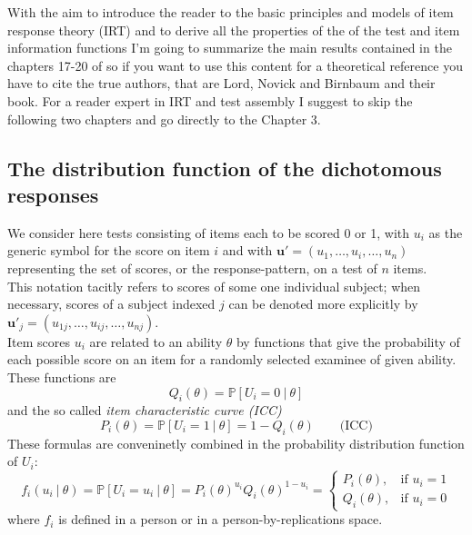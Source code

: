 With the aim to introduce the reader to the basic principles and models of item response theory (IRT) and to derive all the properties of the of the test and item information functions I'm going to summarize the main results contained in the chapters 17-20 of \cite{Lord1968} so if you want to use this content for a theoretical reference you have to cite the true authors, that are Lord, Novick and Birnbaum and their book. For a reader expert in IRT and test assembly I suggest to skip the following two chapters and go directly to the Chapter 3. 
\subsection{The distribution function of the dichotomous responses}
We consider here tests consisting of items each to be scored 0 or 1, with $u_i$ as the generic symbol for the score on item $i$ and with $\boldsymbol{u}' = (u_1,\ldots,u_i,\ldots,u_n)$ representing the set of scores, or the response-pattern, on a test of $n$ items.\\
This notation tacitly refers to scores of some one individual subject; when necessary, scores of a subject indexed $j$ can be denoted more explicitly by $\boldsymbol{u}'_j = (u_{1j},\ldots,u_{ij},\ldots,u_{nj})$.\\
Item scores $u_i$ are related to an ability $\theta$ by functions that give the probability of each possible score on an item for a randomly selected examinee of given ability. These functions are 
\begin{equation}
Q_i(\theta)=\mathbb{P}[U_i=0 \ | \ \theta]
\end{equation}
and the so called \textit{item characteristic curve (ICC)}
\begin{equation}
P_i(\theta)=\mathbb{P}[U_i=1 \ | \ \theta]=1-Q_i(\theta) \qquad \text{(ICC)}
\end{equation}
These formulas are conveninetly combined in the probability distribution function of $U_i$:
\begin{equation}
f_i(u_i \ | \ \theta) = \mathbb{P}[U_i=u_i \ | \ \theta]=P_i(\theta)^{u_i}Q_i(\theta)^{1-u_i}= \begin{cases} P_i(\theta), & \mbox{if } u_i=1\\ Q_i(\theta), & \mbox{if } u_i=0 \end{cases}
\end{equation}
where $f_i$ is defined in a person or in a person-by-replications space. \\
